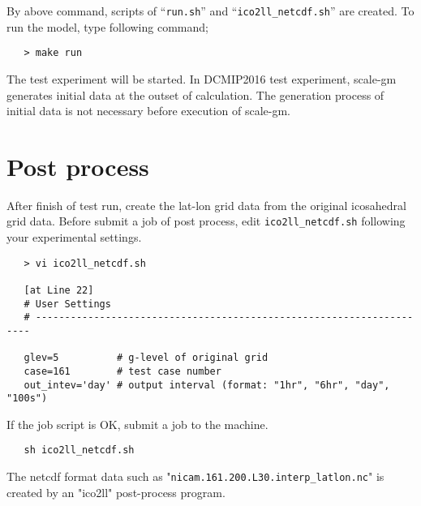 By above command, scripts of ``\verb|run.sh|'' and ``\verb|ico2ll_netcdf.sh|'' are created.
To run the model, type following command;

 \begin{verbatim}
   > make run
 \end{verbatim}

The test experiment will be started.
In DCMIP2016 test experiment, scale-gm generates initial data at the outset of calculation.
The generation process of initial data is not necessary before execution of scale-gm.



\section{Post process}
 After finish of test run, create the lat-lon grid data from
 the original icosahedral grid data.
 Before submit a job of post process, edit \verb|ico2ll_netcdf.sh|
 following your experimental settings.
 \begin{verbatim}
   > vi ico2ll_netcdf.sh

   [at Line 22]
   # User Settings
   # ---------------------------------------------------------------------

   glev=5          # g-level of original grid
   case=161        # test case number
   out_intev='day' # output interval (format: "1hr", "6hr", "day", "100s")
 \end{verbatim}

 \noindent If the job script is OK, submit a job to the machine.
 \begin{verbatim}
   sh ico2ll_netcdf.sh
 \end{verbatim}


 \noindent The netcdf format data such as "\verb|nicam.161.200.L30.interp_latlon.nc|"
 is created by an "ico2ll" post-process program.

